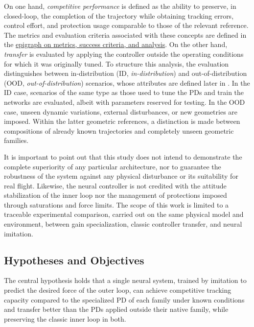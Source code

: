 On one hand, \emph{competitive performance} is defined as the ability to preserve, in closed-loop, the completion of the trajectory while obtaining tracking errors, control effort, and protection usage comparable to those of the relevant reference. The metrics and evaluation criteria associated with these concepts are defined in the \hyperref[subsubsec:metricas-criterios]{epigraph on metrics, success criteria, and analysis}. On the other hand, \emph{transfer} is evaluated by applying the controller outside the operating conditions for which it was originally tuned. To structure this analysis, the evaluation distinguishes between in-distribution (ID, \textit{in-distribution}) and out-of-distribution (OOD, \textit{out-of-distribution}) scenarios, whose attributes are defined later in . In the ID case, scenarios of the same type as those used to tune the PDs and train the networks are evaluated, albeit with parameters reserved for testing. In the OOD case, unseen dynamic variations, external disturbances, or new geometries are imposed. Within the latter geometric references, a distinction is made between compositions of already known trajectories and completely unseen geometric families.

It is important to point out that this study does not intend to demonstrate the complete superiority of any particular architecture, nor to guarantee the robustness of the system against any physical disturbance or its suitability for real flight. Likewise, the neural controller is not credited with the attitude stabilization of the inner loop nor the management of protections imposed through saturations and force limits. The scope of this work is limited to a traceable experimental comparison, carried out on the same physical model and environment, between gain specialization, classic controller transfer, and neural imitation.

\subsection{Hypotheses and Objectives}
\label{subsec:hipotesis-objetivos}

The central hypothesis holds that a single neural system, trained by imitation to predict the desired force of the outer loop, can achieve competitive tracking capacity compared to the specialized PD of each family under known conditions and transfer better than the PDs applied outside their native family, while preserving the classic inner loop in both.

